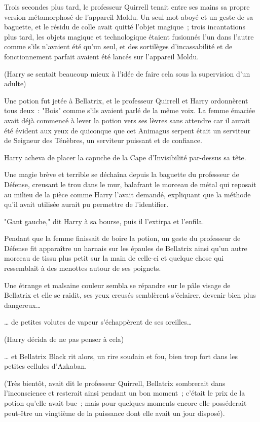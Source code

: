 Trois secondes plus tard, le professeur Quirrell tenait entre ses mains sa propre version métamorphosé de l'appareil Moldu. Un seul mot aboyé et un geste de sa baguette, et le résidu de colle avait quitté l'objet magique~; trois incantations plus tard, les objets magique et technologique étaient fusionnés l'un dans l'autre comme s'ils n'avaient été qu'un seul, et des sortilèges d'incassabilité et de fonctionnement parfait avaient été lancés sur l'appareil Moldu.

(Harry se sentait beaucoup mieux à l'idée de faire cela sous la supervision d'un adulte)

Une potion fut jetée à Bellatrix, et le professeur Quirrell et Harry ordonnèrent tous deux~: "Bois" comme s'ils avaient parlé de la même voix. La femme émaciée avait déjà commencé à lever la potion vers ses lèvres sans attendre car il aurait été évident aux yeux de quiconque que cet Animagus serpent était un serviteur de Seigneur des Ténèbres, un serviteur puissant et de confiance.

Harry acheva de placer la capuche de la Cape d'Invisibilité par-dessus sa tête.

Une magie brève et terrible se déchaîna depuis la baguette du professeur de Défense, creusant le trou dans le mur, balafrant le morceau de métal qui reposait au milieu de la pièce comme Harry l'avait demandé, expliquant que la méthode qu'il avait utilisée aurait pu permettre de l'identifier.

"Gant gauche," dit Harry à sa bourse, puis il l'extirpa et l'enfila.

Pendant que la femme finissait de boire la potion, un geste du professeur de Défense fit apparaître un harnais sur les épaules de Bellatrix ainsi qu'un autre morceau de tissu plus petit sur la main de celle-ci et quelque chose qui ressemblait à des menottes autour de ses poignets.

Une étrange et malsaine couleur sembla se répandre sur le pâle visage de Bellatrix et elle se raidit, ses yeux creusés semblèrent s'éclairer, devenir bien plus dangereux…

… de petites volutes de vapeur s'échappèrent de ses oreilles…

(Harry décida de ne pas penser à cela)

… et Bellatrix Black rit alors, un rire soudain et fou, bien trop fort dans les petites cellules d'Azkaban.

(Très bientôt, avait dit le professeur Quirrell, Bellatrix sombrerait dans l'inconscience et resterait ainsi pendant un bon moment~; c'était le prix de la potion qu'elle avait bue~; mais pour quelques moments encore elle posséderait peut-être un vingtième de la puissance dont elle avait un jour disposé).

